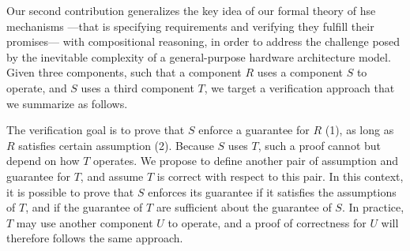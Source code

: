 Our second contribution generalizes the key idea of our formal theory of \ac{hse} mechanisms
---that is specifying requirements and verifying they fulfill
their promises--- with compositional reasoning, in order to address the
challenge posed by the inevitable complexity of a general-purpose hardware
architecture model.
%
Given three components, such that a component \( R \) uses a component \( S \)
to operate, and \( S \) uses a third component \( T \), we target a verification
approach that we summarize as follows.

\begin{center}
\end{center}

The verification goal is to prove that \( S \) enforce a guarantee for \( R \)
(1), as long as \( R \) satisfies certain assumption (2).
%
Because \( S \) uses \( T \), such a proof cannot but depend  on how \( T \)
operates.
%
We propose to define another pair of assumption and guarantee for \( T \), and
assume \( T \) is correct with respect to this pair.
%
In this context, it is possible to prove that \( S \) enforces its guarantee if
it satisfies the assumptions of \( T \), and if the guarantee of \( T \) are
sufficient about the guarantee of \( S \).
%
In practice, \( T \) may use another component \( U \) to operate, and a proof
of correctness for \( U \) will therefore follows the same approach.

